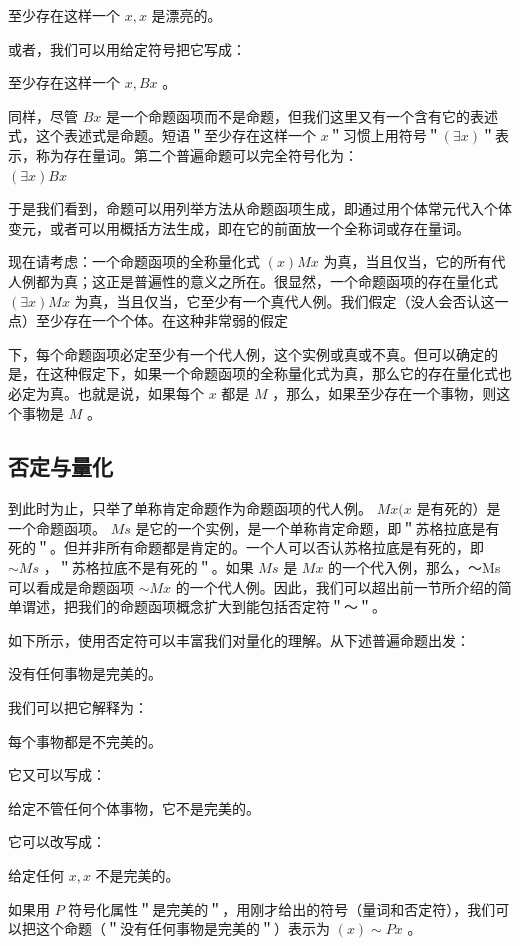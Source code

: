 至少存在这样一个 $x, x$ 是漂亮的。

或者，我们可以用给定符号把它写成：

至少存在这样一个 $x, B x$ 。

同样，尽管 $B x$ 是一个命题函项而不是命题，但我们这里又有一个含有它的表述式，这个表述式是命题。短语＂至少存在这样一个 $x$＂习惯上用符号＂$(\exists x)$＂表示，称为存在量词。第二个普遍命题可以完全符号化为：\\
$(\exists x) B x$

于是我们看到，命题可以用列举方法从命题函项生成，即通过用个体常元代入个体变元，或者可以用概括方法生成，即在它的前面放一个全称词或存在量词。

现在请考虑：一个命题函项的全称量化式 $(x) M x$ 为真，当且仅当，它的所有代人例都为真；这正是普遍性的意义之所在。很显然，一个命题函项的存在量化式 $(\exists x) M x$ 为真，当且仅当，它至少有一个真代人例。我们假定（没人会否认这一点）至少存在一个个体。在这种非常弱的假定

下，每个命题函项必定至少有一个代人例，这个实例或真或不真。但可以确定的是，在这种假定下，如果一个命题函项的全称量化式为真，那么它的存在量化式也必定为真。也就是说，如果每个 $x$ 都是 $M$ ，那么，如果至少存在一个事物，则这个事物是 $M$ 。

\subsection{否定与量化}

到此时为止，只举了单称肯定命题作为命题函项的代人例。 $M x(x$ 是有死的）是一个命题函项。 $M s$ 是它的一个实例，是一个单称肯定命题，即＂苏格拉底是有死的＂。但并非所有命题都是肯定的。一个人可以否认苏格拉底是有死的，即 $\sim M s$ ，＂苏格拉底不是有死的＂。如果 $M s$ 是 $M x$ 的一个代入例，那么，～Ms可以看成是命题函项 $\sim M x$ 的一个代人例。因此，我们可以超出前一节所介绍的简单谓述，把我们的命题函项概念扩大到能包括否定符＂～＂。

如下所示，使用否定符可以丰富我们对量化的理解。从下述普遍命题出发：

没有任何事物是完美的。

我们可以把它解释为：

每个事物都是不完美的。

它又可以写成：

给定不管任何个体事物，它不是完美的。

它可以改写成：

给定任何 $x, x$ 不是完美的。

如果用 $P$ 符号化属性＂是完美的＂，用刚才给出的符号（量词和否定符），我们可以把这个命题（＂没有任何事物是完美的＂）表示为 $(x) \sim P x$ 。

